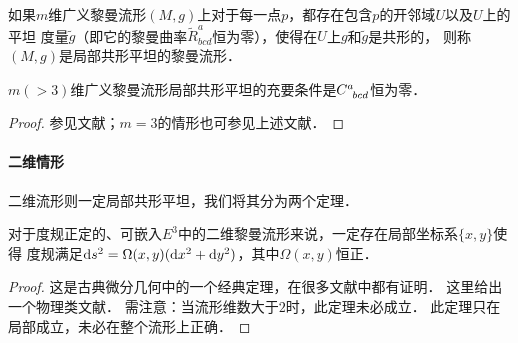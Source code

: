 
\begin{definition}
    如果$m$维广义黎曼流形$(M,g)$上对于每一点$p$，都存在包含$p$的开邻域$U$以及$U$上的平坦
    度量$\tilde{g}$（即它的黎曼曲率$\tilde{R}^a_{bcd}$恒为零），使得在$U$上$g$和$\tilde{g}$是共形的，
    则称$(M,g)$是局部{\heiti 共形平坦}的黎曼流形．
\end{definition}

\begin{theorem}\label{chrg:thm_conformal-flat}
    $m(>3)$维广义黎曼流形局部共形平坦的充要条件是$C^a_{\hphantom{a} bcd}$恒为零．
\end{theorem}
\begin{proof}
    参见文献\parencite[\S 3.3]{baizg-2004-irg}；$m= 3$的情形也可参见上述文献．
\end{proof}


\paragraph{二维情形} 二维流形则一定局部共形平坦，我们将其分为两个定理．

\begin{proposition}\label{chrg:thm_exist-oth-coord}
	对于度规正定的、可嵌入$E^3$中的二维黎曼流形来说，一定存在局部坐标系$\{x,y\}$使得
	度规满足${\rm d}s^2= \Omega(x,y)({\rm d}x^2 + {\rm d}y^2)$，其中$\Omega(x,y)$恒正．
\end{proposition}
\begin{proof}
	这是古典微分几何中的一个经典定理，在很多文献中都有证明．
	这里给出一个物理类文献\parencite[\S 11]{chandrasekhar-1983}．
	需注意：当流形维数大于$2$时，此定理未必成立．
	此定理只在{\kaishu 局部}成立，未必在整个流形上正确．   
\end{proof}

